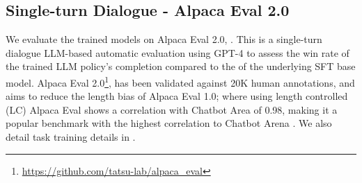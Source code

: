 \documentclass{article}
\theoremstyle{plain}
\theoremstyle{definition}
\theoremstyle{remark}
\begin{document}
\subsection{Single-turn Dialogue - Alpaca Eval 2.0}
We evaluate the trained models on Alpaca Eval 2.0, \citep{alpaca_eval, dubois2023alpacafarm, dubois2024length}. This is a single-turn dialogue LLM-based automatic evaluation using GPT-4 to assess the win rate of the trained LLM policy's completion compared to the of the underlying SFT base model. Alpaca Eval 2.0\footnote{\url{https://github.com/tatsu-lab/alpaca_eval}}, has been validated against 20K human annotations, and aims to reduce the length bias of Alpaca Eval 1.0; where using length controlled (LC) Alpaca Eval shows a correlation with Chatbot Area of 0.98, making it a popular benchmark with the highest correlation to Chatbot Arena \citep{dubois2024length}. We also detail task training details in .
\end{document}
